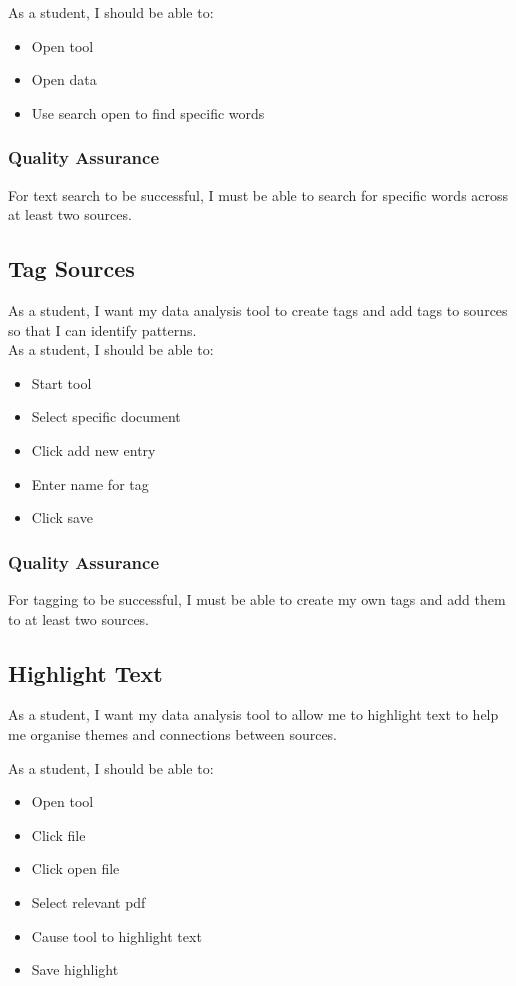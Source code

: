 \documentclass{article}
\begin{document}
As a student, I should be able to:
\begin{itemize}
    \item Open tool
    \item Open data
    \item Use search open to find specific words
\end{itemize}

\subsubsection{Quality Assurance}
For text search to be successful, I must be able to search for specific words across at least two sources.

\subsection{Tag Sources}
As a student, I want my data analysis tool to create tags and add tags to sources so that I can identify patterns.\\

As a student, I should be able to:
\begin{itemize}
    \item Start tool
    \item Select specific document 
    \item Click add new entry
    \item Enter name for tag
    \item Click save
\end{itemize}

\subsubsection{Quality Assurance}
For tagging to be successful, I must be able to create my own tags and add them to at least two sources. 

\subsection{Highlight Text}
As a student, I want my data analysis tool to allow me to highlight text to help me organise themes and connections between sources.

As a student, I should be able to:
\begin{itemize}
    \item Open tool
    \item Click file
    \item Click open file
    \item Select relevant pdf
    \item Cause tool to highlight text
    \item Save highlight 
\end{itemize}
\end{document}

